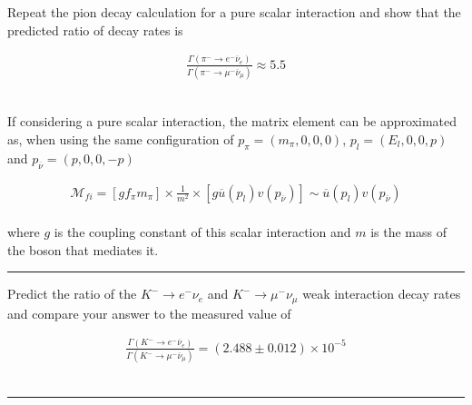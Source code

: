 \begin{problem}{11.6}
Repeat the pion decay calculation for a pure scalar interaction and show that the predicted ratio of decay rates is

\begin{align*}
    \frac{\Gamma\left( \pi^- \to e^- \overbar{\nu}_e \right)}{\Gamma\left( \pi^- \to \mu^- \overbar{\nu}_\mu \right)} \approx 5.5 
\end{align*}\\
\end{problem}
\begin{solution}
If considering a pure scalar interaction, the matrix element can be approximated as, when using the same configuration of  $p_\pi = (m_\pi,0,0,0)$, $p_l = (E_l,0,0,p)$ and $p_{\overbar{\nu}} = (p,0,0,-p)$ 

\begin{align*}
    \mathcal{M}_{fi} = \left[gf_\pi m_\pi\right] \times \frac{1}{m^2} \times \left[ g \overbar{u}(p_l)v(p_{\overbar{\nu}})\right]  \sim  \overbar{u}(p_l)v(p_{\overbar{\nu}})
\end{align*}\\
where $g$ is the coupling constant of this scalar interaction and $m$ is the mass of the boson that mediates it. 
\end{solution}

\noindent\rule{7in}{1.5pt}


\begin{problem}{11.7}
Predict the ratio of the $K^- \to e^- \nu_e$ and $K^- \to \mu^- \nu_\mu$ weak interaction decay rates and compare your answer to the measured value of

\begin{align*}
    \frac{\Gamma\left( K^- \to e^- \overbar{\nu}_e \right)}{\Gamma\left( K^- \to \mu^- \overbar{\nu}_\mu \right)} =   \left( 2.488\pm0.012 \right)\times 10^{-5}  
\end{align*}\\
\end{problem}
\begin{solution}

\end{solution}

\noindent\rule{7in}{1.5pt}


